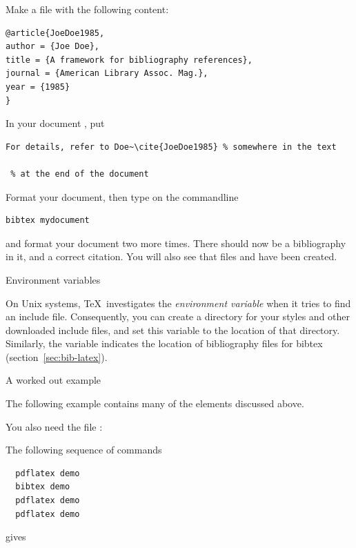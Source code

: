Make a file  with the following content:
\begin{verbatim}
@article{JoeDoe1985,
author = {Joe Doe},
title = {A framework for bibliography references},
journal = {American Library Assoc. Mag.},
year = {1985}
}
\end{verbatim}
In your document , put
\begin{verbatim}
For details, refer to Doe~\cite{JoeDoe1985} % somewhere in the text

 % at the end of the document

\end{verbatim}
Format your document, then type on the commandline
\begin{verbatim}
bibtex mydocument
\end{verbatim}
and format your document two more times. There should now be a
bibliography in it, and a correct citation. You will also see that
files  and  have been created.

 {Environment variables}
\label{sec:texinputs}

On Unix systems, \TeX\ investigates the  \emph{environment
variable} when it tries to find an include file. Consequently, you can
create a directory for your styles and other downloaded include files,
and set this variable to the location of that directory.
Similarly, the  variable indicates the location of
bibliography files for bibtex (section~\ref{sec:bib-latex}).


 {A worked out example}

The following example  contains many of the elements discussed above.

\begin{multicols}{2}
\tiny

\end{multicols}

You also need the file :

\begin{multicols}{2}
\tiny

\end{multicols}

The following sequence of commands
\begin{verbatim}
  pdflatex demo
  bibtex demo
  pdflatex demo
  pdflatex demo
\end{verbatim}
gives 

